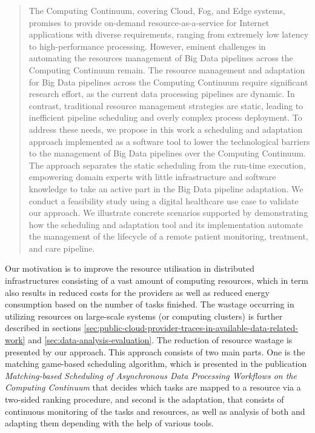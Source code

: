             \begin{quote}
                The Computing Continuum, covering Cloud, Fog, and Edge systems, promises to provide on-demand resource-as-a-service for Internet applications with diverse requirements, ranging from extremely low latency to high-performance processing. However, eminent challenges in automating the resources management of Big Data pipelines across the Computing Continuum remain. The resource management and adaptation for Big Data pipelines across the Computing Continuum require significant research effort, as the current data processing pipelines are dynamic. In contrast, traditional resource management strategies are static, leading to inefficient pipeline scheduling and overly complex process deployment. To address these needs, we propose in this work a scheduling and adaptation approach implemented as a software tool to lower the technological barriers to the management of Big Data pipelines over the Computing Continuum. The approach separates the static scheduling from the run-time execution, empowering domain experts with little infrastructure and software knowledge to take an active part in the Big Data pipeline adaptation. We conduct a feasibility study using a digital healthcare use case to validate our approach. We illustrate concrete scenarios supported by demonstrating how the scheduling and adaptation tool and its implementation automate the management of the lifecycle of a remote patient monitoring, treatment, and care pipeline. \cite{kimovskiBigDataPipeline2022}
            \end{quote}
            Our motivation is to improve the resource utilisation in distributed infrastructures consisting of a vast amount of computing resources, which in term also results in reduced costs for the providers as well as reduced energy consumption based on the number of tasks finished.
            The wastage occurring in utilizing resources on large-scale systems (or computing clusters) is further described in sections \ref{sec:public-cloud-provider-traces-in-available-data-related-work} and \ref{sec:data-analysis-evaluation}.
            The reduction of resource wastage is presented by our  approach. 
            This approach consists of two main parts. One is the matching game-based scheduling algorithm, which is presented in the publication \emph{Matching-based Scheduling of Asynchronous Data Processing Workflows on the Computing Continuum} \cite{mehranMatchingbasedSchedulingAsynchronous2022} that decides which tasks are mapped to a resource via a two-sided ranking procedure, and second is the adaptation, that consists of continuous monitoring of the tasks and resources, as well as analysis of both and adapting them depending with the help of various tools.

